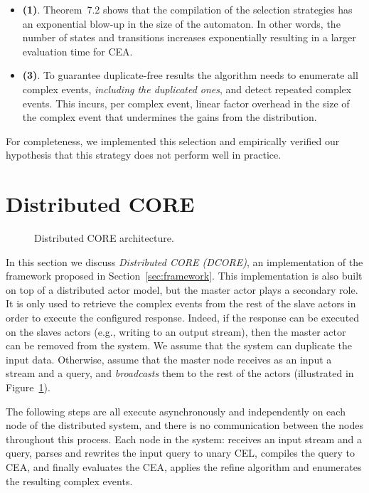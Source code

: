 \begin{itemize}
  \item[] \textbf{(1)}. Theorem~7.2 \cite{formal-framework-cer} shows that the compilation of the selection strategies has an exponential blow-up in the size of the automaton. In other words, the number of states and transitions increases exponentially resulting in a larger evaluation time for CEA.

  \item[] \textbf{(3)}. To guarantee duplicate-free results the algorithm needs to enumerate all complex events, \emph{including the duplicated ones}, and detect repeated complex events. This incurs, per complex event, linear factor overhead in the size of the complex event that undermines the gains from the distribution.
\end{itemize}

For completeness, we implemented this selection and empirically verified our hypothesis that this strategy does not perform well in practice.

\section{Distributed CORE}\label{sec:dcore}

\begin{figure}[H]
  \centering
  \caption{Distributed CORE architecture.}
  \label{fig:dcore}
\end{figure}

In this section we discuss \emph{Distributed CORE (DCORE)}, an implementation of the framework proposed in Section~\ref{sec:framework}. This implementation is also built on top of a distributed actor model, but the master actor plays a secondary role. It is only used to retrieve the complex events from the rest of the slave actors in order to execute the configured response. Indeed, if the response can be executed on the slaves actors (e.g., writing to an output stream), then the master actor can be removed from the system. We assume that the system can duplicate the input data. Otherwise, assume that the master node receives as an input a stream and a query, and \emph{broadcasts} them to the rest of the actors (illustrated in Figure~\ref{fig:dcore}).

The following steps are all execute asynchronously and independently on each node of the distributed system, and there is no communication between the nodes throughout this process. Each node in the system: receives an input stream and a query, parses and rewrites the input query to unary CEL, compiles the query to CEA, and finally evaluates the CEA, applies the refine algorithm and enumerates the resulting complex events.

